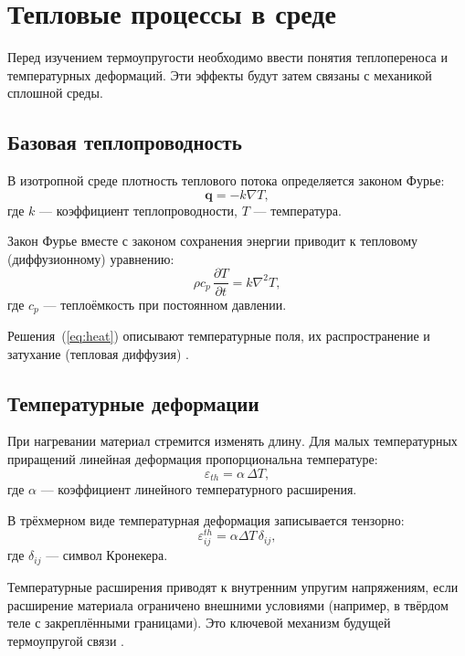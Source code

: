 \section{Тепловые процессы в среде}

Перед изучением термоупругости необходимо ввести понятия теплопереноса и температурных деформаций. Эти эффекты будут затем связаны с механикой сплошной среды.

\subsection{Базовая теплопроводность}

В изотропной среде плотность теплового потока определяется законом Фурье:
\begin{equation}
\mathbf{q} = -k \nabla T ,
\end{equation}
где $k$ --- коэффициент теплопроводности, $T$ --- температура.  

Закон Фурье вместе с законом сохранения энергии приводит к тепловому (диффузионному) уравнению:
\begin{equation}
\rho c_p\, \frac{\partial T}{\partial t} = k \nabla^2 T,
\label{eq:heat}
\end{equation}
где $c_p$ --- теплоёмкость при постоянном давлении.  

Решения~(\ref{eq:heat}) описывают температурные поля, их распространение и затухание (тепловая диффузия) \cite{OpenStax_HE, MIT_heat}.


\subsection{Температурные деформации}

При нагревании материал стремится изменять длину. Для малых температурных приращений линейная деформация пропорциональна температуре:
\begin{equation}
\varepsilon_{th} = \alpha\,\Delta T ,
\end{equation}
где $\alpha$ --- коэффициент линейного температурного расширения.  

В трёхмерном виде температурная деформация записывается тензорно:
\begin{equation}
\varepsilon^{th}_{ij}= \alpha \Delta T\,\delta_{ij},
\end{equation}
где $\delta_{ij}$ --- символ Кронекера.

Температурные расширения приводят к внутренним упругим напряжениям, если расширение материала ограничено внешними условиями (например, в твёрдом теле с закреплёнными границами). Это ключевой механизм будущей термоупругой связи \cite{Feynman_vol2, Purdue_MM}.


